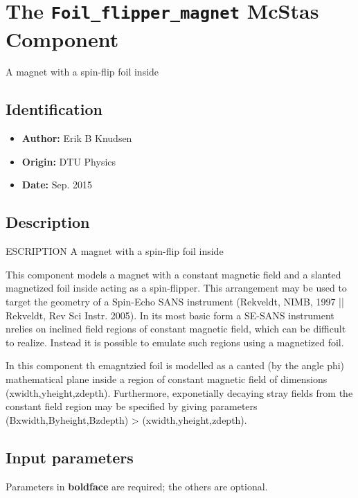 \section{The \texttt{Foil\_flipper\_magnet} McStas Component}
A magnet with a spin-flip foil inside

\subsection*{Identification}
\begin{itemize}
  \item \textbf{Author:} Erik B Knudsen
  \item \textbf{Origin:} DTU Physics
  \item \textbf{Date:} Sep. 2015
\end{itemize}

\subsection*{Description}
ESCRIPTION A magnet with a spin-flip foil inside

This component models a magnet with a constant magnetic field and a slanted magnetized foil inside acting as a spin-flipper. This arrangement may be used to target the geometry of a Spin-Echo SANS instrument (Rekveldt, NIMB, 1997 || Rekveldt, Rev Sci Instr. 2005). In its most basic form a SE-SANS instrument nrelies on inclined field regions of constant magnetic field, which can be difficult to realize. Instead it is possible to emulate such regions using a magnetized foil.

In this component th emagntzied foil is modelled as a canted (by the angle phi) mathematical plane inside a region of constant magnetic field of dimensions (xwidth,yheight,zdepth). Furthermore, exponetially decaying stray fields from the constant field region may be specified by giving parameters (Bxwidth,Byheight,Bzdepth) \textgreater{} (xwidth,yheight,zdepth).

\subsection*{Input parameters}
Parameters in \textbf{boldface} are required; the others are optional.

